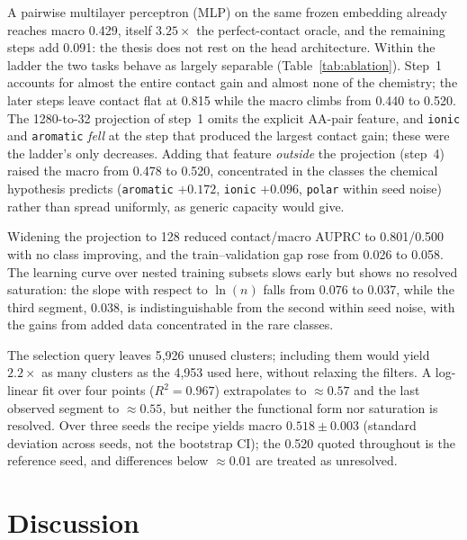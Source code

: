 \documentclass[12pt]{article}
\begin{document}
A pairwise multilayer perceptron (MLP) on the same frozen embedding already reaches
macro 0.429, itself $3.25\times$ the perfect-contact oracle, and the remaining steps add
0.091: the thesis does not rest on the head architecture. Within the ladder the two
tasks behave as largely separable (Table~\ref{tab:ablation}). Step~1 accounts for
almost the entire contact gain and almost none of the chemistry; the later steps leave
contact flat at 0.815 while the macro climbs from 0.440 to 0.520. The 1280-to-32
projection of step~1 omits the explicit AA-pair feature, and \texttt{ionic} and
\texttt{aromatic} \emph{fell} at the step that produced the largest contact gain; these
were the ladder's only decreases. Adding that feature \emph{outside} the projection
(step~4) raised the macro from 0.478 to 0.520, concentrated in the classes the chemical
hypothesis predicts (\texttt{aromatic} $+0.172$, \texttt{ionic} $+0.096$, \texttt{polar}
within seed noise) rather than spread uniformly, as generic capacity would give.

Widening the projection to 128 reduced contact/macro AUPRC to 0.801/0.500 with no class
improving, and the train--validation gap rose from 0.026 to 0.058. The learning curve
over nested training subsets slows early but shows no resolved saturation: the slope with
respect to $\ln(n)$ falls from 0.076 to 0.037, while the third segment, 0.038, is
indistinguishable from the second within seed noise, with the gains from added data
concentrated in the rare classes.

The selection query leaves 5,926 unused clusters; including them would yield $2.2\times$
as many clusters as the 4,953 used here, without relaxing the filters. A log-linear fit over four points
($R^2=0.967$) extrapolates to $\approx0.57$ and the last observed segment to
$\approx0.55$, but neither the functional form nor saturation is resolved. Over three seeds
the recipe yields macro $0.518 \pm 0.003$ (standard deviation across seeds, not the
bootstrap CI); the 0.520 quoted throughout is the reference seed, and differences below
$\approx0.01$ are treated as unresolved.

\section{Discussion}
\label{sec:discussion}
\end{document}
